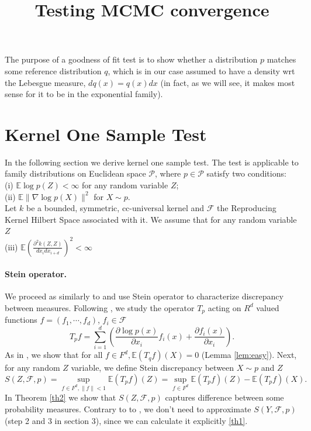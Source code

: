 \documentclass{article}
\title{Testing MCMC convergence}
\author{}
\date{}
\newcommand{\ev}{\mathbb{E}}
\begin{document}
\maketitle

The purpose of a goodness of fit test is to show whether a distribution
$p$ matches some reference distribution $q$, which is in our case
assumed to have a density wrt the Lebesgue measure, $dq(x)=q(x)dx$
(in fact, as we will see, it makes most sense for it to be in the
exponential family).

\section{Kernel One Sample Test}
In the following section we derive kernel one sample test. The test is applicable to family distributions on Euclidean space  $\mathcal{P}$, where $p \in \mathcal{P}$ satisfy two conditions: \\ 
(i) $\ev \log p(Z)    <\infty$ for any random variable $Z$; \\
(ii) $\ev   \| \nabla \log p(X) \|^2  $  for $X \sim p$.\\
Let $k$ be a bounded, symmetric, cc-universal \cite{sriperumbudur2011universality}  kernel  and $\mathcal{F}$  the Reproducing Kernel Hilbert Space  associated with it. We assume that for any random variable $Z$ \\ 
(iii) $\ev \left(\frac{\partial^{2} k(Z,Z) }{dx_i dx_{i+d} }\right)^2<\infty$


\paragraph{Stein operator.}
We proceed as similarly to \cite{mackey2015multivariate,stein1972} and use Stein operator to characterize discrepancy between measures. Following \cite{mackey2015multivariate}, we study the operator $T_p$ acting on $R^d$ valued functions $f = (f_1,\cdots,f_d)$, $f_i \in \mathcal{F}$ 
\[
T_{p} f=  \sum_{i=1}^{d} \left( \frac{\partial \log p(x)}{ \partial x_i} f_i(x)+\frac{\partial f_i(x)}{ \partial x_i} \right).
\]
As in \cite{mackey2015multivariate}, we show that for all $f \in F^d, \ev (T_{q}f)(X) = 0$ (Lemma \ref{lem:easy}). Next, for any random $Z$ variable, we define Stein discrepancy between $X \sim p$ and $Z$ 
\[
 S(Z,\mathcal{F},p) = \sup_{f \in F^d,\| f \|<1} \ev (T_{p}f) (Z)  = \sup_{ f \in F^d } \ev (T_{p}f)(Z) - \ev (T_{p}f) (X).
\]
In Theorem \ref{th2} we show that  $S(Z,\mathcal{F},p)$ captures difference between some probability measures. Contrary to to \cite{mackey2015multivariate}, we don't need to approximate $S(Y,\mathcal{F},p)$ (step 2 and 3 in section 3), since we can calculate it explicitly \ref{th1}. 
\end{document}
